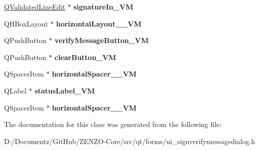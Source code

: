 \begin{DoxyCompactItemize}
\mbox{\label{class_ui___sign_verify_message_dialog_ace99f22e7f8373fddff98dd2057b56d3}} 
\mbox{\hyperlink{class_q_validated_line_edit}{Q\+Validated\+Line\+Edit}} $\ast$ {\bfseries signature\+In\+\_\+\+VM}
\item 
\mbox{\label{class_ui___sign_verify_message_dialog_af1ad00971a20a7cf2ed7ea789b2a7c6e}} 
Q\+H\+Box\+Layout $\ast$ {\bfseries horizontal\+Layout\+\_\+\_\+\+VM}
\item 
\mbox{\label{class_ui___sign_verify_message_dialog_af650e7a322f652a17a1813395750e13a}} 
Q\+Push\+Button $\ast$ {\bfseries verify\+Message\+Button\+\_\+\+VM}
\item 
\mbox{\label{class_ui___sign_verify_message_dialog_ae60ff317cf417cc1f82a3f4d159c5b52}} 
Q\+Push\+Button $\ast$ {\bfseries clear\+Button\+\_\+\+VM}
\item 
\mbox{\label{class_ui___sign_verify_message_dialog_a6ea7d27d9896f99627d20cd002a61858}} 
Q\+Spacer\+Item $\ast$ {\bfseries horizontal\+Spacer\+\_\+\_\+\+VM}
\item 
\mbox{\label{class_ui___sign_verify_message_dialog_a73bd7fafd0b4de4f37409b10e63d3d96}} 
Q\+Label $\ast$ {\bfseries status\+Label\+\_\+\+VM}
\item 
\mbox{\label{class_ui___sign_verify_message_dialog_ab78b07382b942d9844b20765d6521bb2}} 
Q\+Spacer\+Item $\ast$ {\bfseries horizontal\+Spacer\+\_\+\_\+\+VM}
\end{DoxyCompactItemize}


The documentation for this class was generated from the following file\+:\begin{DoxyCompactItemize}
\item 
D\+:/\+Documentz/\+Git\+Hub/\+Z\+E\+N\+Z\+O-\/\+Core/src/qt/forms/ui\+\_\+signverifymessagedialog.\+h\end{DoxyCompactItemize}
